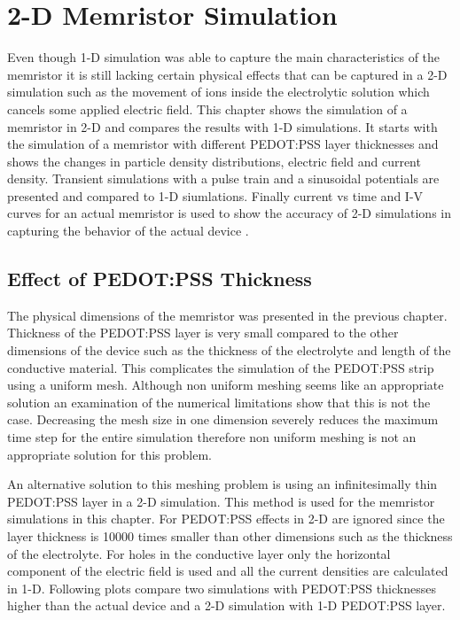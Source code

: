 
\chapter{2-D Memristor Simulation} %

\label{Chapter6} %

\begin{doublespace}

Even though 1-D simulation was able to capture the main characteristics of the memristor it is still lacking certain physical effects that can be captured in a 2-D simulation such as the movement of ions inside the electrolytic solution which cancels some applied electric field. This chapter shows the simulation of a memristor in 2-D and compares the results with 1-D simulations. It starts with the simulation of a memristor with different PEDOT:PSS layer thicknesses and shows the changes in particle density distributions, electric field and current density. 
Transient simulations with a pulse train and a sinusoidal potentials are presented and compared to 1-D siumlations. Finally current vs time and I-V curves for an actual memristor is used to show the accuracy of 2-D simulations in capturing the behavior of the actual device .  

\section{Effect of PEDOT:PSS Thickness}

The physical dimensions of the memristor was presented in the previous chapter. Thickness of the PEDOT:PSS layer is very small compared to the other dimensions of the device such as the thickness of the electrolyte and length of the conductive material. This complicates the simulation of the PEDOT:PSS strip using a uniform mesh. Although non uniform meshing seems like an appropriate solution an examination of the numerical limitations show that this is not the case. Decreasing the mesh size in one dimension severely reduces the maximum time step for the entire simulation therefore non uniform meshing is not an appropriate solution for this problem. 

An alternative solution to this meshing problem is using an infinitesimally thin PEDOT:PSS layer in a 2-D simulation. This method is used for the memristor simulations in this chapter. For PEDOT:PSS effects in 2-D are ignored since the layer thickness is 10000 times smaller than other dimensions such as the thickness of the electrolyte. For holes in the conductive layer only the horizontal component of the electric field is used and all the current densities are calculated in 1-D. Following plots compare two simulations with PEDOT:PSS thicknesses higher than the actual device and a 2-D simulation with 1-D PEDOT:PSS layer.  


\end{doublespace}

